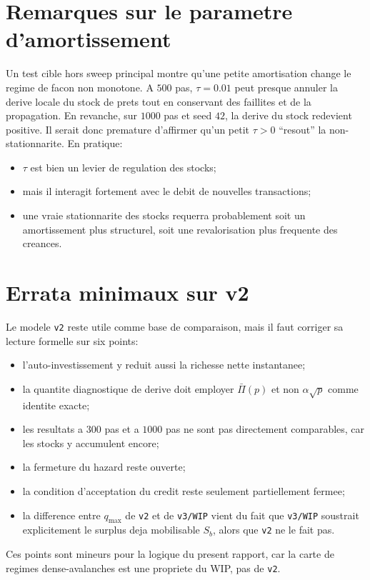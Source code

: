 \documentclass[11pt,a4paper]{article}
\begin{document}
\section{Remarques sur le parametre d'amortissement}
Un test cible hors sweep principal montre qu'une petite amortisation change le regime de facon non monotone. A $500$ pas, $\tau=0.01$ peut presque annuler la derive locale du stock de prets tout en conservant des faillites et de la propagation. En revanche, sur $1000$ pas et seed $42$, la derive du stock redevient positive. Il serait donc premature d'affirmer qu'un petit $\tau>0$ ``resout'' la non-stationnarite. En pratique:
\begin{itemize}
\item $\tau$ est bien un levier de regulation des stocks;
\item mais il interagit fortement avec le debit de nouvelles transactions;
\item une vraie stationnarite des stocks requerra probablement soit un amortissement plus structurel, soit une revalorisation plus frequente des creances.
\end{itemize}

\section{Errata minimaux sur v2}
Le modele \texttt{v2} reste utile comme base de comparaison, mais il faut corriger sa lecture formelle sur six points:
\begin{itemize}
\item l'auto-investissement y reduit aussi la richesse nette instantanee;
\item la quantite diagnostique de derive doit employer $\bar \Pi(p)$ et non $\alpha\sqrt p$ comme identite exacte;
\item les resultats a $300$ pas et a $1000$ pas ne sont pas directement comparables, car les stocks y accumulent encore;
\item la fermeture du hazard reste ouverte;
\item la condition d'acceptation du credit reste seulement partiellement fermee;
\item la difference entre $q_{\max}$ de \texttt{v2} et de \texttt{v3/WIP} vient du fait que \texttt{v3/WIP} soustrait explicitement le surplus deja mobilisable $S_b$, alors que \texttt{v2} ne le fait pas.
\end{itemize}
Ces points sont mineurs pour la logique du present rapport, car la carte de regimes dense-avalanches est une propriete du WIP, pas de \texttt{v2}.
\end{document}
